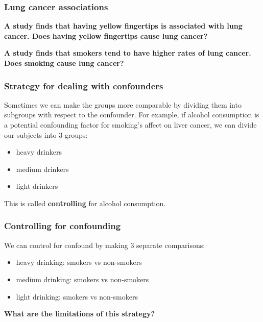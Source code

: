 \documentclass[a4paper]{article}
\begin{document}
\subsubsection{Lung cancer associations}
\begin{greenbox}
	\textbf{A study finds that having yellow fingertips is associated with lung cancer. Does having yellow fingertips cause lung cancer?}
\end{greenbox}
\begin{greenbox}
	\textbf{A study finds that smokers tend to have higher rates of lung cancer. Does smoking cause lung cancer?}
\end{greenbox}
\subsubsection{Strategy for dealing with confounders}
Sometimes we can make the groups more comparable by dividing them into subgroups with respect to the confounder.
For example, if alcohol consumption is a potential confounding factor for smoking's affect on liver cancer, we can divide our subjects into 3 groups:
\begin{itemize}
	\item heavy drinkers
	\item medium drinkers
	\item light drinkers
\end{itemize}
This is called \textbf{controlling} for alcohol consumption.
\subsubsection{Controlling for confounding}
We can control for confound by making 3 separate comparisons:
\begin{itemize}
	\item heavy drinking: smokers vs non-smokers
	\item medium drinking: smokers vs non-smokers
	\item light drinking: smokers vs non-smokers
\end{itemize}
\begin{greenbox}
	\textbf{What are the limitations of this strategy?}
\end{greenbox}
\end{document}
